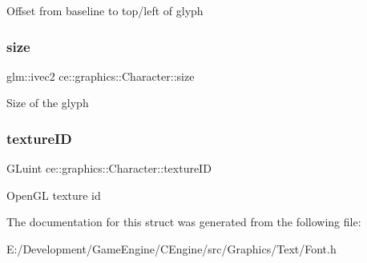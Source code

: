 Offset from baseline to top/left of glyph \mbox{\label{structce_1_1graphics_1_1_character_a6d9408d38c787d6c158db425d2595a02}} 
\subsubsection{\texorpdfstring{size}{size}}
{\footnotesize\ttfamily glm\+::ivec2 ce\+::graphics\+::\+Character\+::size}

Size of the glyph \mbox{\label{structce_1_1graphics_1_1_character_ae9dae9443cf985d2e0ee4974ea3a434c}} 
\subsubsection{\texorpdfstring{texture\+ID}{textureID}}
{\footnotesize\ttfamily G\+Luint ce\+::graphics\+::\+Character\+::texture\+ID}

Open\+GL texture id 

The documentation for this struct was generated from the following file\+:\begin{DoxyCompactItemize}
\item 
E\+:/\+Development/\+Game\+Engine/\+C\+Engine/src/\+Graphics/\+Text/Font.\+h\end{DoxyCompactItemize}
